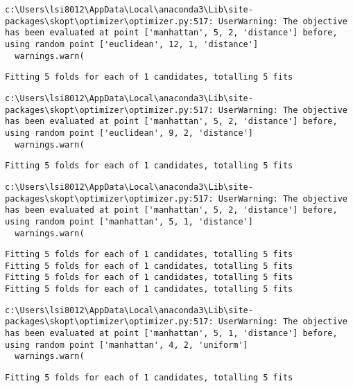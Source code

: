 \documentclass[
  letterpaper,
  DIV=11,
  numbers=noendperiod]{scrreprt}
\begin{document}
\begin{verbatim}
c:\Users\lsi8012\AppData\Local\anaconda3\Lib\site-packages\skopt\optimizer\optimizer.py:517: UserWarning: The objective has been evaluated at point ['manhattan', 5, 2, 'distance'] before, using random point ['euclidean', 12, 1, 'distance']
  warnings.warn(
\end{verbatim}

\begin{verbatim}
Fitting 5 folds for each of 1 candidates, totalling 5 fits
\end{verbatim}

\begin{verbatim}
c:\Users\lsi8012\AppData\Local\anaconda3\Lib\site-packages\skopt\optimizer\optimizer.py:517: UserWarning: The objective has been evaluated at point ['manhattan', 5, 2, 'distance'] before, using random point ['euclidean', 9, 2, 'distance']
  warnings.warn(
\end{verbatim}

\begin{verbatim}
Fitting 5 folds for each of 1 candidates, totalling 5 fits
\end{verbatim}

\begin{verbatim}
c:\Users\lsi8012\AppData\Local\anaconda3\Lib\site-packages\skopt\optimizer\optimizer.py:517: UserWarning: The objective has been evaluated at point ['manhattan', 5, 2, 'distance'] before, using random point ['manhattan', 5, 1, 'distance']
  warnings.warn(
\end{verbatim}

\begin{verbatim}
Fitting 5 folds for each of 1 candidates, totalling 5 fits
Fitting 5 folds for each of 1 candidates, totalling 5 fits
Fitting 5 folds for each of 1 candidates, totalling 5 fits
Fitting 5 folds for each of 1 candidates, totalling 5 fits
\end{verbatim}

\begin{verbatim}
c:\Users\lsi8012\AppData\Local\anaconda3\Lib\site-packages\skopt\optimizer\optimizer.py:517: UserWarning: The objective has been evaluated at point ['manhattan', 5, 1, 'distance'] before, using random point ['manhattan', 4, 2, 'uniform']
  warnings.warn(
\end{verbatim}

\begin{verbatim}
Fitting 5 folds for each of 1 candidates, totalling 5 fits
\end{verbatim}
\end{document}

